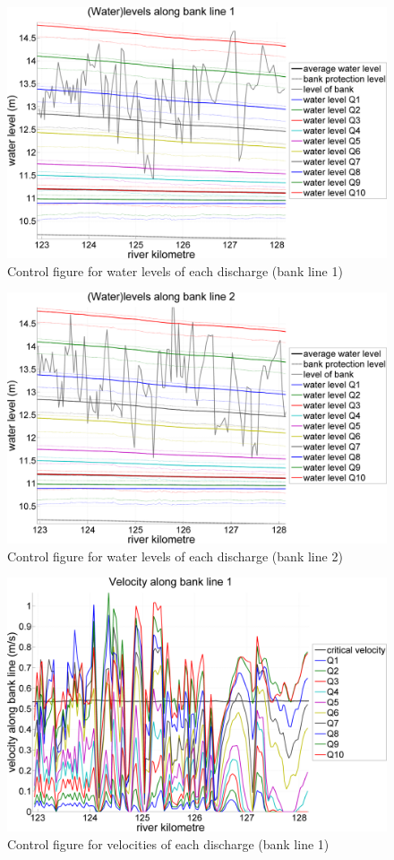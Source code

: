 \begin{figure}
\includegraphics[width=\textwidth]{figures/Fig2-8.png}
\caption{Control figure for water levels of each discharge (bank line 1)}
\label{Fig2.8}
\end{figure}

\begin{figure}
\includegraphics[width=\textwidth]{figures/Fig2-9.png}
\caption{Control figure for water levels of each discharge (bank line 2)}
\label{Fig2.9}
\end{figure}

\begin{figure}
\includegraphics[width=\textwidth]{figures/Fig2-10.png}
\caption{Control figure for velocities of each discharge (bank line 1)}
\label{Fig2.10}
\end{figure}

